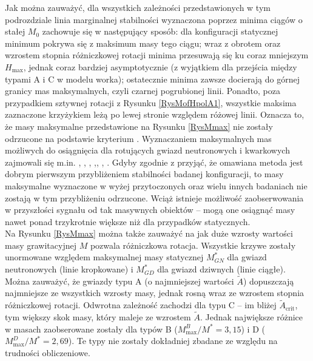 \documentclass{bachelor_thesis}
\begin{document}
            \indent Jak można zauważyć, dla wszystkich zależności przedstawionych w tym podrozdziale linia marginalnej stabilności wyznaczona poprzez minima ciągów o stałej $M_0$ zachowuje się w następujący sposób: dla konfiguracji statycznej minimum pokrywa się z maksimum masy tego ciągu; wraz z obrotem oraz wzrostem stopnia różniczkowej rotacji minima przesuwają się ku coraz mniejszym $H_{\textrm{max}}$, jednak coraz bardziej asymptotycznie (z wyjątkiem dla przejścia między typami A i C w modelu worka); ostatecznie minima zawsze docierają do górnej granicy mas maksymalnych, czyli czarnej pogrubionej linii. Ponadto, poza przypadkiem sztywnej rotacji z Rysunku \ref{RysMofHpolA1}, wszystkie maksima zaznaczone krzyżykiem leżą po lewej stronie względem różowej linii. Oznacza to, że masy maksymalne przedstawione na Rysunku \ref{RysMmax} nie zostały odrzucone na podstawie kryterium \cite{Friedman1988}. Wyznaczaniem maksymalnych mas możliwych do osiągnięcia dla rotujących gwiazd neutronowych i kwarkowych zajmowali się m.in. \cite{Cook1994b}, \cite{Baumgarte2000}, \cite{Ansorg2009}, \cite{Giacomazzo2011},\cite{Studzinska2016}, \cite{Rosinska2017}, \cite{Espino2019}. Gdyby zgodnie z \cite{Bozzola2018} przyjąć, że omawiana metoda jest dobrym pierwszym przybliżeniem stabilności badanej konfiguracji, to masy maksymalne wyznaczone w wyżej przytoczonych oraz wielu innych badaniach nie zostają w tym przybliżeniu odrzucone. Wciąż istnieje możliwość zaobserwowania w przyszłości sygnału od tak masywnych obiektów -- mogą one osiągnąć masy nawet ponad trzykrotnie większe niż dla przypadków statycznych.\\
            \indent Na Rysunku \ref{RysMmax} można także zauważyć na jak duże wzrosty wartości masy grawitacyjnej $M$ pozwala różniczkowa rotacja. Wszystkie krzywe zostały unormowane względem maksymalnej masy statycznej $M^*_{GN}$ dla gwiazd neutronowych (linie kropkowane) i $M^*_{GD}$ dla gwiazd dziwnych (linie ciągłe). Można zauważyć, że gwiazdy typu A (o najmniejszej wartości $\tilde{A}$) dopuszczają najmniejsze ze wszystkich wzrosty masy, jednak rosną wraz ze wzrostem stopnia różniczkowej rotacji. Odwrotna zależność zachodzi dla typu C -- im bliżej $\tilde{A}_\textrm{crit}$, tym większy skok masy, który maleje ze wzrostem $\tilde{A}$. Jednak największe różnice w masach zaobserowane zostały dla typów B ($M_\textrm{max}^B/M^*=3,15$) i D ($M_\textrm{max}^D/M^*=2,69$). Te typy nie zostały dokładniej zbadane ze względu na trudności obliczeniowe.
\end{document}
